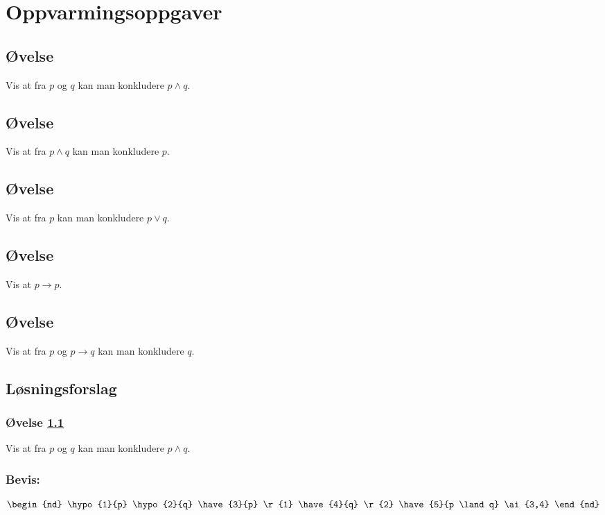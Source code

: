\documentclass[../main.tex]{subfiles}
\begin{document}
\section{Oppvarmingsoppgaver}

\bigskip
\subsection{Øvelse} \label{ex:oppvarming:1}
Vis at fra \(p\) og \(q\) kan man konkludere \(p \land q\).


\bigskip
\subsection{Øvelse} \label{ex:oppvarming:2}
Vis at fra \(p \land q\) kan man konkludere \(p\).



\bigskip
\subsection{Øvelse} \label{ex:oppvarming:3}
Vis at fra \(p\) kan man konkludere \(p \lor q\).


\bigskip
\subsection{Øvelse} \label{ex:oppvarming:4}
Vis at \(p \to p\).


\bigskip
\subsection{Øvelse} \label{ex:oppvarming:5}
Vis at fra \(p\) og \(p \to q\) kan man konkludere \(q\).




\newpage
\subsection{Løsningsforslag}

\bigskip
\subsubsection{Øvelse \ref{ex:oppvarming:1}} \label{ex:oppvarming:1:solution}
Vis at fra \(p\) og \(q\) kan man konkludere \(p \land q\).

\subsubsection*{Bevis:}
\[
\begin{nd}
  \hypo{1}{p}
  \hypo{2}{q}
  \have{3}{p} \r{1}
  \have{4}{q} \r{2}
  \have{5}{p \land q} \ai{3,4}
\end{nd}
\]
\end{document}
